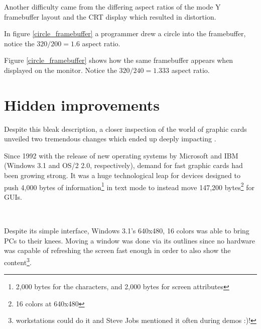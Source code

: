  \label{vga_ratio}
\par
\vspace{-10pt}
Another difficulty came from the differing aspect ratios of the mode Y framebuffer layout and the CRT display which resulted in distortion. \\
\par
\vspace{-10pt}
\par
In figure \ref{circle_framebuffer} a programmer drew a circle into the framebuffer, notice the $ 320/200 = 1.6 $ aspect ratio.\\
\par
{}
\par
Figure \ref{circle_framebuffer} shows how the same framebuffer appears when displayed on the monitor. Notice the $ 320/240 = 1.333 $ aspect ratio.\\







\section{Hidden improvements}
Despite this bleak description, a closer inspection of the world of graphic cards unveiled two tremendous changes which ended up deeply impacting \doom. \\
\par
Since 1992 with the release of new operating systems by Microsoft and IBM (Windows 3.1 and OS/2 2.0, respectively), demand for fast graphic cards had been growing strong. It was a huge technological leap for devices designed to push 4,000 bytes of information\footnote{2,000 bytes for the characters, and 2,000 bytes for screen attributes} in text mode to instead move 147,200 bytes\footnote{16 colors at 640x480} for GUIs.

\\
\par 
Despite its simple interface, Windows 3.1's 640x480, 16 colors was able to bring PCs to their knees. Moving a window was done via its outlines since no hardware was capable of refreshing the screen fast enough in order to also show the content\footnote{\NeXT workstations could do it and Steve Jobs mentioned it often during demos :)!}.



